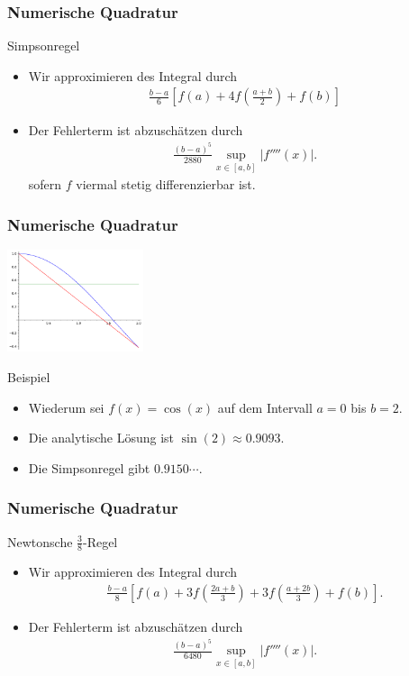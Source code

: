 \documentclass{beamer}
\newcommand\bc[1]{\left({#1}\right)}
\newcommand\bcfr[2]{\bc{\frac{#1}{#2}}}
\newcommand\brk[1]{\left\lbrack{#1}\right\rbrack}
\renewcommand{\ae}{\"a}
\renewcommand{\oe}{\"o}
\newcommand{\mytitle}{Numerische Quadratur}
\begin{document}
\begin{frame}\frametitle{\mytitle}
	\begin{block}{Simpsonregel}
		\begin{itemize}
			\item Wir approximieren des Integral durch
				\begin{align*}
					\frac{b-a}{6}\brk{f(a)+4f\bcfr{a+b}2+f(b)}
				\end{align*}
			\item Der Fehlerterm ist abzusch\ae tzen durch
				\begin{align*}
					\frac{(b-a)^5}{2880}\sup_{x\in[a,b]}|f''''(x)|.
				\end{align*}
				sofern $f$ viermal stetig differenzierbar ist.
		\end{itemize}
	\end{block}
\end{frame}

\begin{frame}\frametitle{\mytitle}
	\hfill\includegraphics[height=30mm]{pics/plot_trapez.pdf}
	\begin{block}{Beispiel}
		\begin{itemize}
			\item Wiederum sei $f(x)=\cos(x)$ auf dem Intervall $a=0$ bis $b=2$.
			\item Die analytische L\oe sung ist $\sin(2)\approx0.9093$.
			\item Die Simpsonregel gibt $0.9150\cdots$.
		\end{itemize}
	\end{block}
\end{frame}

\begin{frame}\frametitle{\mytitle}
	\begin{block}{Newtonsche $\frac{3}{8}$-Regel}
		\begin{itemize}
			\item Wir approximieren des Integral durch
				\begin{align*}
					\frac{b-a}{8}\brk{f(a)+3f\bcfr{2a+b}3+3f\bcfr{a+2b}3+f(b)}.
				\end{align*}
			\item Der Fehlerterm ist abzusch\ae tzen durch
				\begin{align*}
					\frac{(b-a)^5}{6480}\sup_{x\in[a,b]}|f''''(x)|.
				\end{align*}
		\end{itemize}
	\end{block}
\end{frame}
\end{document}
